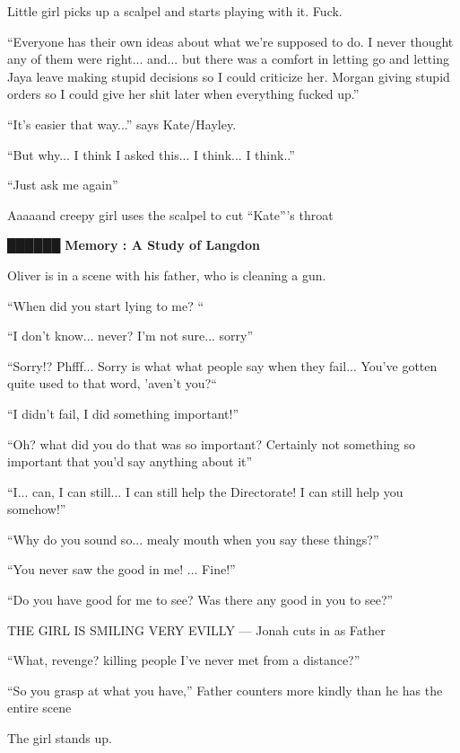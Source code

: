 Little girl picks up a scalpel and starts playing with it. Fuck. 



``Everyone has their own ideas about what we're supposed to do. I never thought any of them were right... and... but there was a comfort in letting go and letting Jaya leave making stupid decisions so I could criticize her.  Morgan giving stupid orders so I could give her shit later when everything fucked up.''

``It's easier that way...'' says Kate/Hayley.

``But why... I think I asked this... I think... I think..''

``Just ask me again''

Aaaaand creepy girl uses the scalpel to cut ``Kate'''s throat



 {\LARGE \textbf{ {\color[RGB]{51,51,51}██████} } }  {\LARGE \textbf{ Memory : A Study of Langdon} } 

Oliver is in a scene with his father, who is cleaning a gun. 

``When did you start lying to me? ``

``I don't know... never? I'm not sure... sorry''

``Sorry!? Phfff... Sorry is what what people say when they fail... You've gotten quite used to that word, 'aven't you?``

``I didn't fail, I did something important!''

``Oh? what did you do that was so important?  Certainly not something so important that you'd say anything about it''

``I... can, I can still... I can still help the Directorate! I can still help you somehow!''

``Why do you sound so... mealy mouth when you say these things?''

``You never saw the good in me!  ... Fine!''

``Do you have good for me to see?  Was there any good in you to see?''



THE GIRL IS SMILING VERY EVILLY --- Jonah cuts in as Father



``What, revenge? killing people I've never met from a distance?''

``So you grasp at what you have,'' Father counters more kindly than he has the entire scene

The girl stands up.

